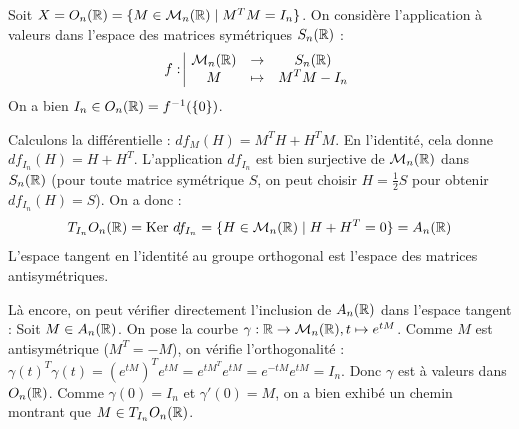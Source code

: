 \begin{exemple}[title=Espace tangent au groupe orthogonal]
    Soit $X = O_n(\mathbb{R}) = \{M \in \mathcal{M}_n(\mathbb{R}) \mid M^TM = I_n\}$.
    On considère l'application à valeurs dans l'espace des matrices symétriques $S_n(\mathbb{R})$ :
    \[ f: \space \begin{array}{|ccc} \displaystyle \mathcal{M}_n(\mathbb{R}) & \to & \displaystyle S_n(\mathbb{R}) \\ \displaystyle M & \mapsto & \displaystyle M^TM - I_n \end{array} \]
    On a bien $I_n \in O_n(\mathbb{R}) = f^{-1}(\{0\})$.

    Calculons la différentielle : $df_M(H) = M^TH + H^TM$.
    En l'identité, cela donne $df_{I_n}(H) = H + H^T$.
    L'application $df_{I_n}$ est bien surjective de $\mathcal{M}_n(\mathbb{R})$ dans $S_n(\mathbb{R})$ (pour toute matrice symétrique $S$, on peut choisir $H = \frac{1}{2}S$ pour obtenir $df_{I_n}(H) = S$). On a donc :
    \[ T_{I_n} O_n(\mathbb{R}) = \operatorname{Ker} \, df_{I_n} = \{H \in \mathcal{M}_n(\mathbb{R}) \mid H + H^T = 0\} = A_n(\mathbb{R}) \]
    L'espace tangent en l'identité au groupe orthogonal est l'espace des matrices antisymétriques.

    \lvspace \avspace {}

    Là encore, on peut vérifier directement l'inclusion de $A_n(\mathbb{R})$ dans l'espace tangent :
    Soit $M \in A_n(\mathbb{R})$.
    On pose la courbe $\gamma : \mathbb{R} \to \mathcal{M}_n(\mathbb{R}), t \mapsto e^{tM}$.
    Comme $M$ est antisymétrique ($M^T = -M$), on vérifie l'orthogonalité : $\gamma(t)^T \gamma(t) = (e^{tM})^T e^{tM} = e^{tM^T} e^{tM} = e^{-tM} e^{tM} = I_n$.
    Donc $\gamma$ est à valeurs dans $O_n(\mathbb{R})$.
    Comme $\gamma(0) = I_n$ et $\gamma'(0) = M$, on a bien exhibé un chemin montrant que $M \in T_{I_n} O_n(\mathbb{R})$.
\end{exemple}